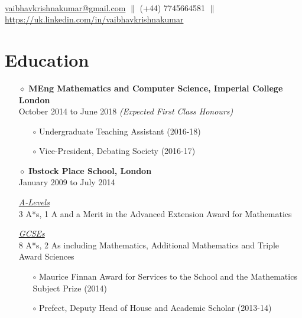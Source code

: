 \documentclass[a4paper]{article}
\begin{document}

{} \\
\href{mailto:vaibhavkrishnakumar@gmail.com} {vaibhavkrishnakumar@gmail.com} \hspace{10pt} $\parallel$ \hspace{10pt} (+44) 7745664581 \hspace{10pt} $\parallel$ \hspace{10pt} \href{https://uk.linkedin.com/in/vaibhavkrishnakumar} {https://uk.linkedin.com/in/vaibhavkrishnakumar}

\vspace{-12pt}
\section*{Education}
\vspace{-7pt}

\begin{itemize}

\item[$\diamond$] \textbf{MEng Mathematics and Computer Science, Imperial College London} \\
	October 2014 to June 2018	\textit{(Expected First Class Honours)}
\begin{itemize}
\item[$\circ$] Undergraduate Teaching Assistant (2016-18)
\item[$\circ$] Vice-President, Debating Society (2016-17)
\end{itemize}

\item[$\diamond$] \textbf{Ibstock Place School, London} \\
	January 2009 to July 2014

\textit{\underline{A-Levels}} \\
3 A*s, 1 A and a Merit in the Advanced Extension Award for Mathematics

\textit{\underline{GCSEs}} \\
	8 A*s, 2 As including Mathematics, Additional Mathematics and Triple Award Sciences

\begin{itemize}
\item[$\circ$] Maurice Finnan Award for Services to the School and the Mathematics Subject Prize (2014)
\item[$\circ$] Prefect, Deputy Head of House and Academic Scholar (2013-14)
\end{itemize}	

\end{itemize}
\end{document}
